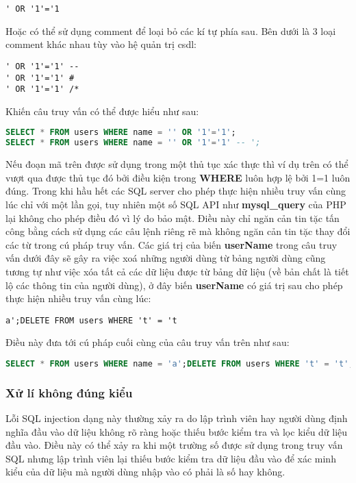 \documentclass[../main-report.tex]{subfiles}
\begin{document}
\begin{lstlisting}
' OR '1'='1
\end{lstlisting}

Hoặc có thể sử dụng comment để loại bỏ các kí tự phía sau. Bên dưới là 3 loại comment khác nhau tùy vào hệ quản trị \acrshort{csdl}:

\begin{lstlisting}
' OR '1'='1' --
' OR '1'='1' #
' OR '1'='1' /*
\end{lstlisting}

Khiến câu truy vấn có thể được hiểu như sau:

\begin{lstlisting}[language=SQL]
SELECT * FROM users WHERE name = '' OR '1'='1';
SELECT * FROM users WHERE name = '' OR '1'='1' -- ';
\end{lstlisting}

Nếu đoạn mã trên được sử dụng trong một thủ tục xác thực thì ví dụ trên có thể vượt qua được thủ tục đó bởi điều kiện trong \textbf{WHERE} luôn hợp lệ bởi 1=1 luôn đúng. Trong khi hầu hết các SQL server cho phép thực hiện nhiều truy vấn cùng lúc chỉ với một lần gọi, tuy nhiên một số SQL API như \textbf{mysql\_query} của PHP lại không cho phép điều đó vì lý do bảo mật. Điều này chỉ ngăn cản tin tặc tấn công bằng cách sử dụng các câu lệnh riêng rẽ mà không ngăn cản tin tặc thay đổi các từ trong cú pháp truy vấn. Các giá trị của biến \textbf{userName} trong câu truy vấn dưới đây sẽ gây ra việc xoá những người dùng từ bảng người dùng cũng tương tự như việc xóa tất cả các dữ liệu được từ bảng dữ liệu (về bản chất là tiết lộ các thông tin của người dùng), ở đây biến \textbf{userName} có giá trị sau cho phép thực hiện nhiều truy vấn cùng lúc:

\begin{lstlisting}
a';DELETE FROM users WHERE 't' = 't
\end{lstlisting}


Điều này đưa tới cú pháp cuối cùng của câu truy vấn trên như sau:

\begin{lstlisting}[language=SQL]
SELECT * FROM users WHERE name = 'a';DELETE FROM users WHERE 't' = 't';
\end{lstlisting}

\subsubsection*{Xử lí không đúng kiểu}
Lỗi SQL injection dạng này thường xảy ra do lập trình viên hay người dùng định nghĩa đầu vào dữ liệu không rõ ràng hoặc thiếu bước kiểm tra và lọc kiểu dữ liệu đầu vào. Điều này có thể xảy ra khi một trường số được sử dụng trong truy vấn SQL nhưng lập trình viên lại thiếu bước kiểm tra dữ liệu đầu vào để xác minh kiểu của dữ liệu mà người dùng nhập vào có phải là số hay không.
\end{document}
